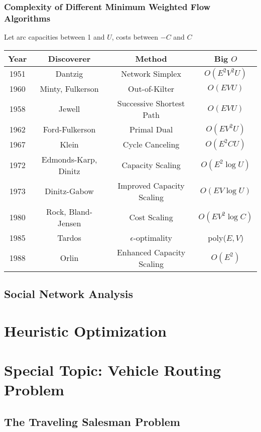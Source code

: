			\section{Complexity of Different Minimum Weighted Flow Algorithms}
				Let arc capacities between 1 and $U$, costs between $-C$ and $C$
				\begin{table*}[ht]
					\centering
					\begin{tabular} {|c|c|c|c|}
						\hline
						Year & Discoverer & Method & Big $O$ \\
						\hline
						1951 & Dantzig & Network Simplex & $O(E^2V^2U)$ \\
						1960 & Minty, Fulkerson & Out-of-Kilter & $O(EVU)$\\
						1958 & Jewell & Successive Shortest Path & $O(EVU)$ \\
						1962 & Ford-Fulkerson & Primal Dual & $O(EV^2U)$ \\
						1967 & Klein & Cycle Canceling & $O(E^2CU)$ \\
						1972 & Edmonds-Karp, Dinitz & Capacity Scaling & $O(E^2 \log U)$\\
						1973 & Dinitz-Gabow & Improved Capacity Scaling & $O(EV\log U)$ \\
						1980 & Rock, Bland-Jensen & Cost Scaling & $O(EV^2\log C)$\\
						1985 & Tardos & $\epsilon$-optimality & poly($E,V$)\\
						1988 & Orlin & Enhanced Capacity Scaling & $O(E^2)$ \\
						\hline
					\end{tabular}
				\end{table*}

		\chapter{Social Network Analysis}

	\part{Heuristic Optimization}\label{Heur}

	\part*{Special Topic: Vehicle Routing Problem}\label{VRP}
		\chapter{The Traveling Salesman Problem}

